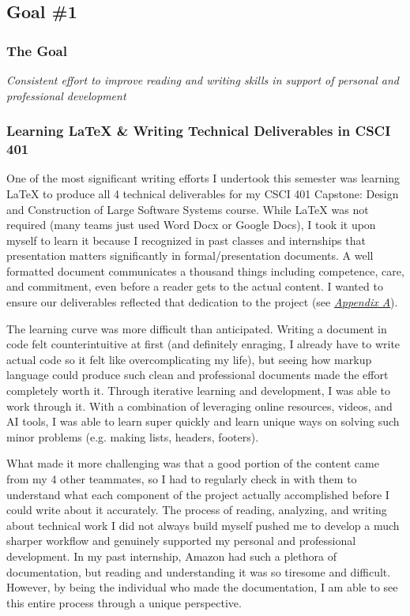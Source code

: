 \documentclass[12pt]{article}
\let\oldhyperref\hyperref
\renewcommand{\hyperref}[2][]{\oldhyperref[#1]{\textit{\uline{#2}}}}
\begin{document}
        \subsection{Goal \#1}

            \subsubsection*{The Goal}
            \textit{Consistent effort to improve reading and writing skills in support of personal and professional development}

            \subsubsection{Learning \LaTeX{} \& Writing Technical Deliverables in CSCI 401}
            \label{sec:latex-deliverables}

            One of the most significant writing efforts I undertook this semester was learning \LaTeX{} to produce all 4 technical deliverables for my CSCI 401 Capstone: Design and Construction of Large Software Systems course. While \LaTeX{} was not required (many teams just used Word Docx or Google Docs), I took it upon myself to learn it because I recognized in past classes and internships that presentation matters significantly in formal/presentation documents. A well formatted document communicates a thousand things including competence, care, and commitment, even before a reader gets to the actual content. I wanted to ensure our deliverables reflected that dedication to the project (see \hyperref[appendix:a]{Appendix A}).

            The learning curve was more difficult than anticipated. Writing a document in code felt counterintuitive at first (and definitely enraging, I already have to write actual code so it felt like overcomplicating my life), but seeing how markup language could produce such clean and professional documents made the effort completely worth it. Through iterative learning and development, I was able to work through it. With a combination of leveraging online resources, videos, and AI tools, I was able to learn super quickly and learn unique ways on solving such minor problems (e.g. making lists, headers, footers).
            
            What made it more challenging was that a good portion of the content came from my 4 other teammates, so I had to regularly check in with them to understand what each component of the project actually accomplished before I could write about it accurately. The process of reading, analyzing, and writing about technical work I did not always build myself pushed me to develop a much sharper workflow and genuinely supported my personal and professional development. In my past internship, Amazon had such a plethora of documentation, but reading and understanding it was so tiresome and difficult. However, by being the individual who made the documentation, I am able to see this entire process through a unique perspective.
\end{document}
